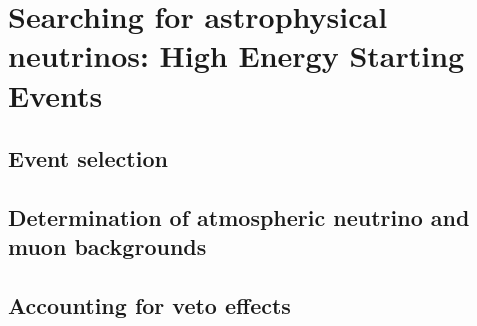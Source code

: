 \chapter{Searching for astrophysical neutrinos: High Energy Starting Events}

\section{Event selection\label{sec:selection}}
\begingroup
\graphicspath{{results/HESE_Final_Paper/}}

\endgroup

\section{Determination of atmospheric neutrino and muon backgrounds\label{sec:backgrounds}}
\begingroup
\graphicspath{{results/HESE_Final_Paper/}}

\endgroup

\section{Accounting for veto effects}
